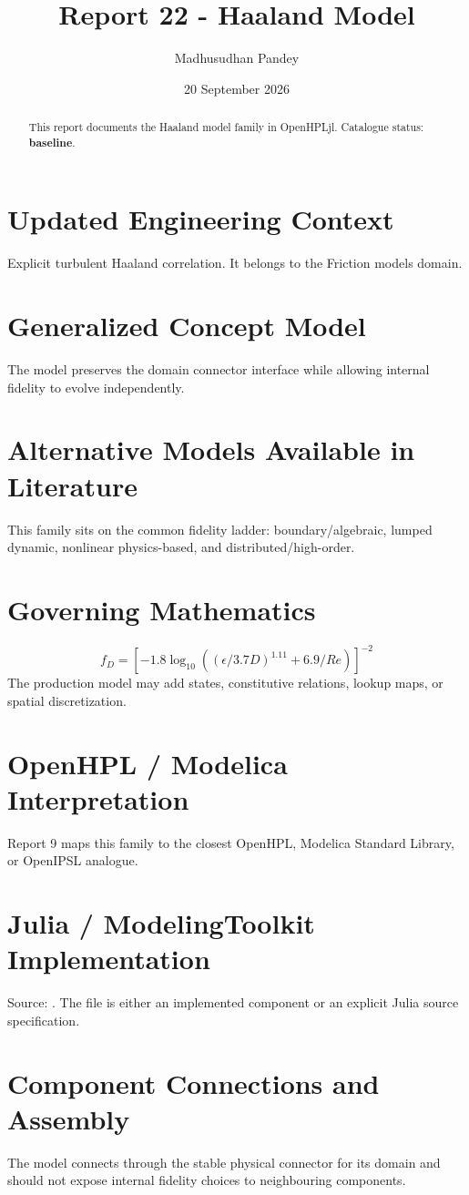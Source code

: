 \documentclass[10pt,a4paper]{article}
\title{Report 22 - Haaland Model}
\author{Madhusudhan Pandey}
\date{20 September 2026}
\begin{document}
\maketitle
\begin{abstract}This report documents the Haaland model family in OpenHPLjl. Catalogue status: \textbf{baseline}.\end{abstract}
\section{Updated Engineering Context}Explicit turbulent Haaland correlation. It belongs to the Friction models domain.
\section{Generalized Concept Model}The model preserves the domain connector interface while allowing internal fidelity to evolve independently.
\section{Alternative Models Available in Literature}This family sits on the common fidelity ladder: boundary/algebraic, lumped dynamic, nonlinear physics-based, and distributed/high-order.
\section{Governing Mathematics}\[f_D=\left[-1.8\log_{10}\left((\epsilon/3.7D)^{1.11}+6.9/Re\right)\right]^{-2}\]The production model may add states, constitutive relations, lookup maps, or spatial discretization.
\section{OpenHPL / Modelica Interpretation}Report 9 maps this family to the closest OpenHPL, Modelica Standard Library, or OpenIPSL analogue.
\section{Julia / ModelingToolkit Implementation}Source: \texttt{}. The file is either an implemented component or an explicit Julia source specification.
\section{Component Connections and Assembly}The model connects through the stable physical connector for its domain and should not expose internal fidelity choices to neighbouring components.
\end{document}
